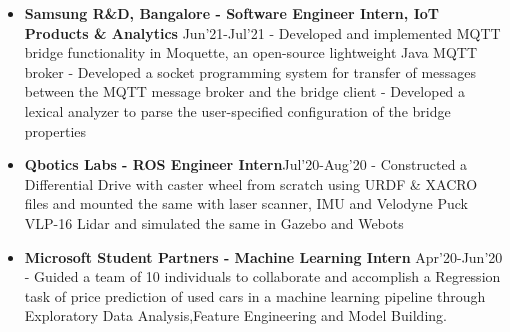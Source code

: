 \documentclass{article}
\begin{document}
\begin{itemize}
    \item{\textbf{\large{Samsung R\&D, Bangalore - Software Engineer Intern, IoT Products \& Analytics}}} \hfill \textmd{Jun'21-Jul'21}
          \newline
          \textmd{- Developed and implemented MQTT bridge functionality in Moquette, an open-source lightweight Java MQTT broker}
          \newline
          \textmd{- Developed a socket programming system for transfer of messages between the MQTT message broker and the bridge client}
          \newline
          \textmd{- Developed a lexical analyzer to parse the user-specified configuration of the bridge properties}

    \item{\textbf{\large{Qbotics Labs - ROS Engineer Intern}}}\hfill \textmd{Jul'20-Aug'20}
          \newline
          \textmd{- Constructed a Differential Drive with caster wheel from scratch using URDF \& XACRO files and mounted the same with laser scanner, IMU and Velodyne Puck VLP-16 Lidar and simulated the same in Gazebo and Webots}

    \item{\textbf{\large{Microsoft Student Partners - Machine Learning Intern}}} \hfill \textmd{Apr'20-Jun'20}
          \newline
          \textmd{- Guided a team of 10 individuals to collaborate and accomplish a Regression task of price prediction of used cars in a machine learning pipeline through Exploratory Data Analysis,Feature Engineering and Model Building.}






\end{itemize}
\end{document}
